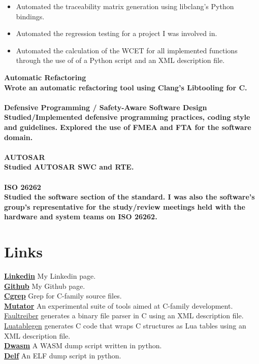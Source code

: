 \documentclass[8pt]{article}
\begin{document}
\begin{multicols}{2}
\begin{itemize}
\item Automated the traceability matrix generation using libclang's Python bindings.
\item Automated the regression testing for a project I was involved in.
\item Automated the calculation of the WCET for all implemented functions through the use of of a Python script and an XML description file.
  \end{itemize}
  \bf Automatic Refactoring\\ \normalfont Wrote an automatic refactoring tool using Clang's Libtooling for C.\\[5pt]
  \\
  \bf Defensive Programming / Safety-Aware Software Design\\ \normalfont Studied/Implemented defensive programming practices, coding style and guidelines. Explored the use of FMEA and FTA for the software domain.\\[5pt]
  \\
  \bf AUTOSAR\\ \normalfont Studied AUTOSAR SWC and RTE.\\[5pt]
  \\
  \bf ISO 26262\\ \normalfont Studied the software section of the standard. I was also the software's group's representative for the study/review meetings held with the hardware and system teams on ISO 26262.\\[5pt]

  \section*{Links}
  {\bf \href{https://ir.linkedin.com/in/farzad-sadeghi-08426277}{Linkedin}} My Linkedin page.\\[5pt]
  {\bf \href{https://github.com/terminaldweller}{Github}} My Github page.\\[5pt]
  {\bf \href{https://github.com/terminaldweller/cgrep}{Cgrep}} Grep for C-family source files.\\[5pt]
  {\bf \href{https://terminaldweller.github.io/mutator/}{Mutator}} An experimental suite of tools aimed at C-family development.\\[5pt]
  \href{https://github.com/terminaldweller/faultreiber}{Faultreiber} generates a binary file parser in C using an XML description file.\\[5pt]
  \href{https://github.com/terminaldweller/luatablegen}{Luatablegen} generates C code that wraps C structures as Lua tables using an XML description file.\\[5pt]
  {\bf \href{https://github.com/terminaldweller/dwasm}{Dwasm}} A WASM dump script written in python.\\[5pt]
  {\bf \href{https://github.com/terminaldweller/delf}{Delf}} An ELF dump script in python.\\[5pt]


\end{multicols}
\end{document}

